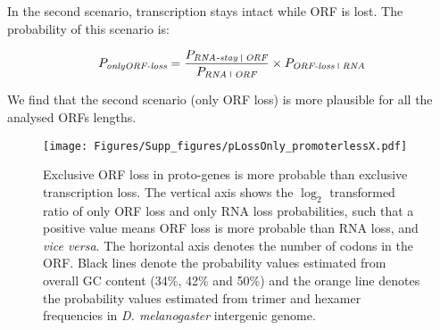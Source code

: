 \documentclass[12pt,a4paper]{article}
\begin{document}
In the second scenario, transcription stays intact while ORF is lost. The probability of this scenario is: 

\vspace{-1em}
\begin{equation}
P_\textit{onlyORF-loss} = \frac{P_\textit{RNA-stay \vline\ ORF}}{P_\textit{RNA \vline \ ORF}} \times P_\textit{ORF-loss \vline\ RNA}
\end{equation}

We find that the second scenario (only ORF loss) is more plausible for all the analysed ORFs lengths.

\begin{figure}[H]
\centering
\texttt{[image: Figures/Supp\_figures/pLossOnly\_promoterlessX.pdf]}
\caption{Exclusive ORF loss in proto-genes is more probable than exclusive transcription loss. The vertical axis shows the $\log_2$ transformed ratio of only ORF loss and only RNA loss probabilities, such that a positive value means ORF loss is more probable than RNA loss, and \textit{vice versa}. The horizontal axis denotes the number of codons in the ORF. Black lines denote the probability values estimated from overall GC content (34\%, 42\% and 50\%) and the orange line denotes the probability values estimated from trimer and hexamer frequencies in \textit{D. melanogaster} intergenic genome.}
\end{figure}

\clearpage



\small

\end{document}
